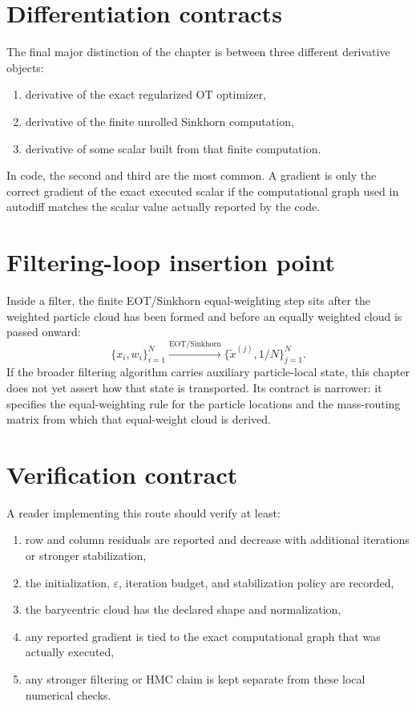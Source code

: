 \section{Differentiation contracts}
\label{sec:bf-eot-differentiation}

The final major distinction of the chapter is between three different derivative
objects:
\begin{enumerate}[label=(\roman*)]
  \item derivative of the exact regularized OT optimizer,
  \item derivative of the finite unrolled Sinkhorn computation,
  \item derivative of some scalar built from that finite computation.
\end{enumerate}
In code, the second and third are the most common.  A gradient is only the
correct gradient of the exact executed scalar if the computational graph used in
autodiff matches the scalar value actually reported by the code.

\section{Filtering-loop insertion point}
\label{sec:bf-eot-loop}

Inside a filter, the finite EOT/Sinkhorn equal-weighting step sits after the
weighted particle cloud has been formed and before an equally weighted cloud is
passed onward:
\begin{equation}
\label{eq:bf-eot-loop}
  \{x_i,w_i\}_{i=1}^N
  \xrightarrow{\mathrm{EOT/Sinkhorn}}
  \{\tilde x^{(j)},1/N\}_{j=1}^N.
\end{equation}
If the broader filtering algorithm carries auxiliary particle-local state, this
chapter does not yet assert how that state is transported.  Its contract is
narrower: it specifies the equal-weighting rule for the particle locations and the
mass-routing matrix from which that equal-weight cloud is derived.

\section{Verification contract}
\label{sec:bf-eot-verification}

A reader implementing this route should verify at least:
\begin{enumerate}[label=(\arabic*)]
  \item row and column residuals are reported and decrease with additional
  iterations or stronger stabilization,
  \item the initialization, \(\varepsilon\), iteration budget, and stabilization
  policy are recorded,
  \item the barycentric cloud has the declared shape and normalization,
  \item any reported gradient is tied to the exact computational graph that was
  actually executed,
  \item any stronger filtering or HMC claim is kept separate from these local
  numerical checks.
\end{enumerate}


